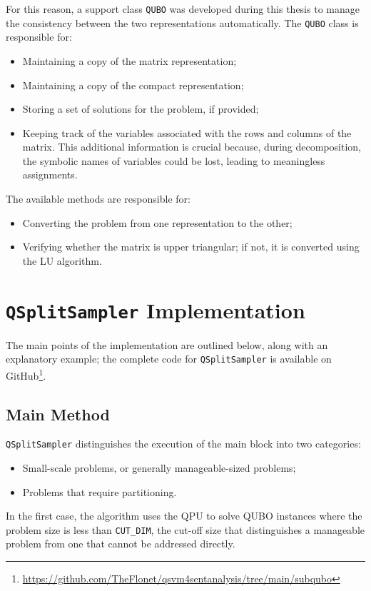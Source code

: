 For this reason, a support class \texttt{QUBO} was developed during this thesis to manage the consistency between the two representations automatically. 
The \texttt{QUBO} class is responsible for: 
\begin{itemize} 
	\item Maintaining a copy of the matrix representation; 
	\item Maintaining a copy of the compact representation; 
	\item Storing a set of solutions for the problem, if provided; 
	\item Keeping track of the variables associated with the rows and col\-umns of the matrix. 
    This additional information is crucial because, during decomposition, the symbolic names of variables could be lost, leading to meaningless assignments.
\end{itemize}

The available methods are responsible for:
\begin{itemize} 
	\item Converting the problem from one representation to the other; 
	\item Verifying whether the matrix is upper triangular; if not, it is converted using the LU algorithm\cite{LU}.
\end{itemize}

\section{\texttt{QSplitSampler} Implementation}

The main points of the implementation are outlined below, along with an explanatory example; the complete code for \texttt{QSplitSampler} is available on GitHub\footnote{\url{https://github.com/TheFlonet/qsvm4sentanalysis/tree/main/subqubo}}.

\subsection{Main Method}

\texttt{QSplitSampler} distinguishes the execution of the main block into two categories: 
\begin{itemize} 
	\item Small-scale problems, or generally manageable-sized problems; 
	\item Problems that require partitioning. 
\end{itemize}

In the first case, the algorithm uses the QPU to solve QUBO instances where the problem size is less than \texttt{CUT\_DIM}, the cut-off size that distinguishes a manageable problem from one that cannot be addressed directly.

